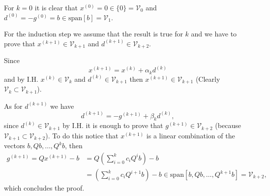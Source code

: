 \documentclass{article}
\begin{document}
For $k=0$ it is clear that $x^{(0)}=0\in\{0\}=\mathcal{V}_0$ and
$d^{(0)}=-g^{(0)}=b\in \text{span}[b]=\mathcal{V}_1$.

For the induction step we assume that the result is true for $k$ and we have to
prove that $x^{(k+1)}\in \mathcal{V}_{k+1}$ and $d^{(k+1)}\in
\mathcal{V}_{k+2}$.

Since
\[
x^{(k+1)}=x^{(k)}+\alpha_kd^{(k)}
\]
and by I.H. $x^{(k)}\in \mathcal{V}_k$ and $d^{(k)}\in\mathcal{V}_{k+1}$ then
$x^{(k+1)}\in
\mathcal{V}_{k+1}$ (Clearly $\mathcal{V}_k\subset\mathcal{V}_{k+1}$).

As for $d^{(k+1)}$ we have
\[
d^{(k+1)}=-g^{(k+1)}+\beta_k d^{(k)},
\]
since $d^{(k)}\in\mathcal{V}_{k+1}$ by I.H. it is enough to prove that
$g^{(k+1)}\in\mathcal{V}_{k+2}$ (because
$\mathcal{V}_{k+1}\subset\mathcal{V}_{k+2}$). To do this notice that
$x^{(k+1)}$ is a linear combination of the vectors $b,Qb,\dots,Q^{k}b$, then
\begin{align*}
g^{(k+1)}=Qx^{(k+1)}-b&=Q\left(\sum_{i=0}^kc_iQ^ib\right) -b\\
&=\left(\sum_{i=0}^kc_iQ^{i+1}b\right)-b \in
\text{span}[b,Qb,\dots,Q^{k+1}b]=\mathcal{V}_{k+2},
\end{align*}
which concludes the proof.
\end{document}
